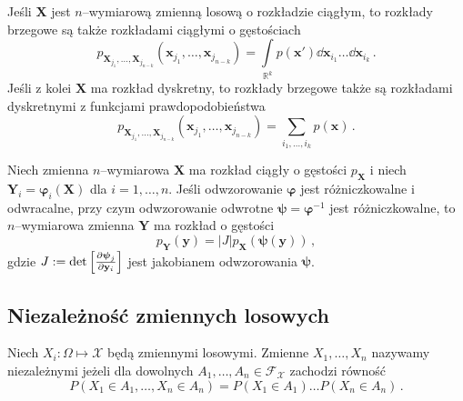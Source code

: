 \documentclass{myclass}
\numberwithin{equation}{section}
\begin{document}
Jeśli \(\mathbf{X}\) jest \(n\)--wymiarową zmienną losową o rozkładzie ciągłym, to rozkłady brzegowe
są także rozkładami ciągłymi o gęstościach
\begin{equation}
    p_{\mathbf{X}_{j_1},\ldots,\mathbf{X}_{j_{n-k}}}(\mathbf{x}_{j_1},\ldots,\mathbf{x}_{j_{n-k}}) = \int\limits_{\mathbb{R}^k} p(\mathbf{x}') \dd{\mathbf{x}_{i_1}}\ldots\dd{\mathbf{x}_{i_k}}\,.
\end{equation}
Jeśli z kolei \(\mathbf{X}\) ma rozkład dyskretny, to rozkłady brzegowe także są rozkładami
dyskretnymi z funkcjami prawdopodobieństwa
\begin{equation}
    p_{\mathbf{X}_{j_1},\ldots,\mathbf{X}_{j_{n-k}}}(\mathbf{x}_{j_1},\ldots,\mathbf{x}_{j_{n-k}}) = \sum_{i_1,\ldots,i_k}p(\mathbf{x})\,.
\end{equation}

\begin{theorem}
Niech zmienna \(n\)--wymiarowa \(\mathbf{X}\) ma rozkład ciągły o gęstości \(p_\mathbf{X}\) i niech
\(\mathbf{Y}_i = \boldsymbol{\varphi}_i(\mathbf{X})\) dla \(i=1,\ldots,n\). Jeśli odwzorowanie
\(\boldsymbol{\varphi}\) jest różniczkowalne i odwracalne, przy czym odwzorowanie odwrotne
\(\boldsymbol{\psi} = \boldsymbol{\varphi}^{-1}\) jest różniczkowalne, to \(n\)--wymiarowa zmienna
\(\mathbf{Y}\) ma rozkład o gęstości
\begin{equation*}
    p_\mathbf{Y}(\mathbf{y}) = |J| p_\mathbf{X}(\boldsymbol{\psi}(\mathbf{y}))\,,
\end{equation*}
gdzie \(J := \det \left[\pdv{\boldsymbol{\psi}_j}{\mathbf{y}_i}\right]\) jest jakobianem
odwzorowania \(\boldsymbol{\psi}\).
\end{theorem}


\subsection{Niezależność zmiennych losowych}

\begin{definition}
Niech \(X_i : \Omega \mapsto \mathcal{X}\) będą zmiennymi losowymi. Zmienne \(X_1,\ldots,X_n\)
nazywamy niezależnymi jeżeli dla dowolnych \(A_1,\ldots,A_n \in \mathcal{F}_\mathcal{X}\) zachodzi
równość
\begin{equation*}
    P(X_1 \in A_1, \ldots, X_n \in A_n) = P(X_1 \in A_1) \ldots P(X_n \in A_n)\,.
\end{equation*}
\end{definition}
\end{document}
